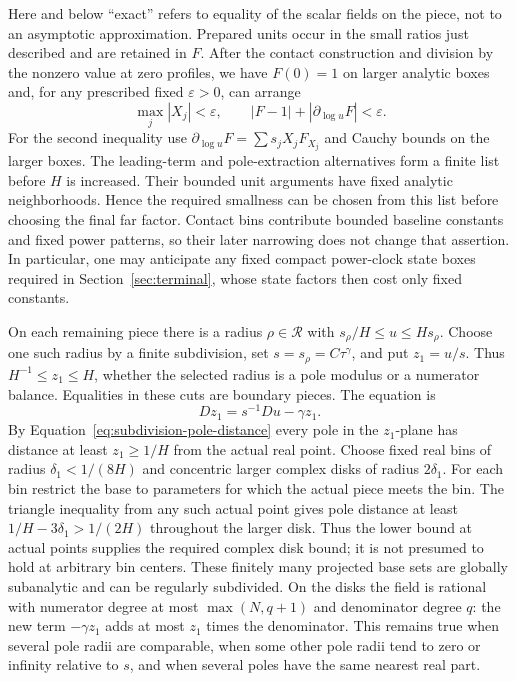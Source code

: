 Here and below ``exact'' refers to equality of the scalar fields on the
piece, not to an asymptotic approximation.  Prepared units occur in the
small ratios just described and are retained in $F$.  After the contact
construction and division by the nonzero value at zero profiles, we have
$F(0)=1$ on larger analytic boxes and, for any prescribed fixed
$\varepsilon>0$, can arrange
\begin{equation}
\label{eq:subdivision-annulus-small}
 \max_j|X_j|<\varepsilon,\qquad
 |F-1|+|\partial_{\log u}F|<\varepsilon.
\end{equation}
For the second inequality use
$\partial_{\log u}F=\sum s_jX_jF_{X_j}$ and Cauchy bounds on the
larger boxes.  The leading-term and pole-extraction alternatives form a
finite list before $H$ is increased.  Their bounded unit arguments have
fixed analytic neighborhoods.  Hence the required smallness can be
chosen from this list before choosing the final far factor.  Contact
bins contribute bounded baseline constants and fixed power patterns, so
their later narrowing does not change that assertion.  In particular,
one may anticipate any fixed compact power-clock state boxes required
in Section~\ref{sec:terminal}, whose state factors then cost only fixed
constants.

On each remaining piece there is a radius $\rho\in\mathcal R$ with
$s_\rho/H\le u\le Hs_\rho$.  Choose one such radius by a finite
subdivision, set $s=s_\rho=C\tau^\gamma$, and put $z_1=u/s$.
Thus $H^{-1}\le z_1\le H$, whether the selected radius is a pole
modulus or a numerator balance.  Equalities in these cuts are boundary
pieces.  The equation is
\[
 Dz_1=s^{-1}Du-\gamma z_1.
\]
By Equation~\eqref{eq:subdivision-pole-distance} every pole in the
$z_1$-plane has distance at least $z_1\ge1/H$ from the actual real
point.  Choose fixed real bins of radius $\delta_1<1/(8H)$ and
concentric larger complex disks of radius $2\delta_1$.  For each bin
restrict the base to parameters for which the actual piece meets the
bin.  The triangle inequality from any such actual point gives pole
distance at least $1/H-3\delta_1>1/(2H)$ throughout the larger disk.
Thus the lower bound at actual points supplies the required complex
disk bound; it is not presumed to hold at arbitrary bin centers.
These finitely many projected base sets are globally subanalytic and
can be regularly subdivided.  On the disks the field is rational with
numerator degree at most $\max(N,q+1)$ and denominator degree $q$:
the new term $-\gamma z_1$ adds at most $z_1$ times the denominator.
This remains true when several pole radii are comparable, when some
other pole radii tend to zero or infinity relative to $s$, and when
several poles have the same nearest real part.

